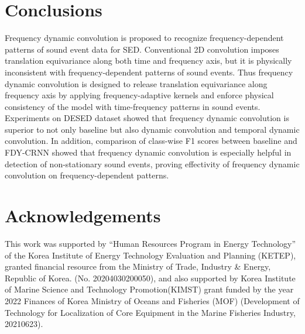 \documentclass[a4paper]{article}
\begin{document}
 
\vspace{5pt}
\section{Conclusions}
\vspace{5pt}
Frequency dynamic convolution is proposed to recognize frequency-dependent patterns of sound event data for SED. Conventional 2D convolution imposes translation equivariance along both time and frequency axis, but it is physically inconsistent with frequency-dependent patterns of sound events. Thus frequency dynamic convolution is designed to release translation equivariance along frequency axis by applying frequency-adaptive kernels and enforce physical consistency of the model with time-frequency patterns in sound events. Experiments on DESED dataset showed that frequency dynamic convolution is superior to not only baseline but also dynamic convolution and temporal dynamic convolution. In addition, comparison of class-wise F1 scores between baseline and FDY-CRNN showed that frequency dynamic convolution is especially helpful in detection of non-stationary sound events, proving effectivity of frequency dynamic convolution on frequency-dependent patterns. 
\vspace{5pt}
\section{Acknowledgements}
\vspace{5pt}
This work was supported by “Human Resources Program in Energy Technology” of the Korea Institute of Energy Technology Evaluation and Planning (KETEP), granted financial resource from the Ministry of Trade, Industry \& Energy, Republic of Korea. (No. 20204030200050), and also supported by Korea Institute of Marine Science and Technology Promotion(KIMST) grant funded by the year 2022 Finances of Korea Ministry of Oceans and Fisheries (MOF) (Development of Technology for Localization of Core Equipment in the Marine Fisheries Industry, 20210623).

\vfill\pagebreak



\end{document}
